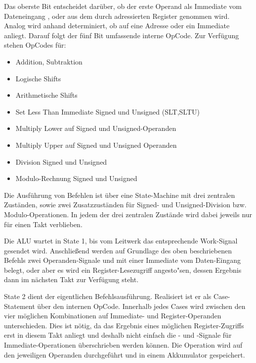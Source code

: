 Das oberste Bit  entscheidet dar\"uber, ob der erste Operand als Immediate vom Dateneingang , oder aus dem durch  adressierten Register genommen wird.
Analog wird anhand  determiniert, ob auf  eine Adresse oder ein Immediate anliegt.
Darauf folgt der f\"unf Bit umfassende interne OpCode. Zur Verf\"ugung stehen OpCodes f\"ur:

\begin{itemize}
\item Addition, Subtraktion
\item Logische Shifts
\item Arithmetische Shifts
\item Set Less Than Immediate Signed und Unsigned (SLT,SLTU)
\item Multiply Lower auf Signed und Unsigned-Operanden
\item Multiply Upper auf Signed und Unsigned Operanden
\item Division Signed und Unsigned
\item Modulo-Rechnung Signed und Unsigned
\end{itemize}




Die Ausf\"uhrung von Befehlen ist \"uber eine State-Machine mit drei zentralen Zust\"anden, sowie zwei Zusatzzust\"anden f\"ur Signed- und Unsigned-Division bzw. Modulo-Operationen. In jedem der drei zentralen Zust\"ande wird dabei jeweils nur f\"ur einen Takt verblieben.


Die ALU wartet in State 1, bis vom Leitwerk das entsprechende Work-Signal gesendet wird.
Anschlie\ss{}end werden auf Grundlage des oben beschriebenen Befehls zwei Operanden-Signale  und  mit einer Immediate vom Daten-Eingang belegt, oder aber es wird ein Register-Lesezugriff angesto"sen, dessen Ergebnis dann im n\"achsten Takt zur Verf\"ugung steht.


State 2 dient der eigentlichen Befehlsausf\"uhrung. Realisiert ist er als Case-Statement \"uber den internen OpCode. Innerhalb jedes Cases wird zwischen den vier m\"oglichen Kombinationen auf Immediate- und Register-Operanden unterschieden.
Dies ist n\"otig, da das Ergebnis eines m\"oglichen Register-Zugriffs erst in diesem Takt anliegt und deshalb nicht einfach die - und -Signale f\"ur Immediate-Operationen \"uberschrieben werden k\"onnen.
Die Operation wird auf den jeweiligen Operanden durchgef\"uhrt und in einem Akkumulator gespeichert.\vspace{10pt}


